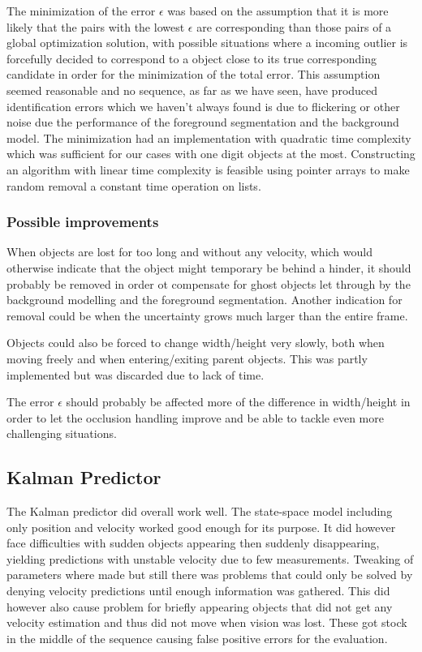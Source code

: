 The minimization of the error $\epsilon$ was based on the assumption that it is more likely that the pairs with the lowest $\epsilon$ are corresponding than those pairs of a global optimization solution, with possible situations where a incoming outlier is forcefully decided to correspond to a object close to its true corresponding candidate in order for the minimization of the total error. This assumption seemed reasonable and no sequence, as far as we have seen, have produced identification errors which we haven't always found is due to flickering or other noise due the performance of the foreground segmentation and the background model.
The minimization had an implementation with quadratic time complexity which was sufficient for our cases with one digit objects at the most. Constructing an algorithm with linear time complexity is feasible using pointer arrays to make random removal a constant time operation on lists.

\subsubsection{Possible improvements}
When objects are lost for too long and without any velocity, which would otherwise indicate that the object might temporary be behind a hinder, it should probably be removed in order ot compensate for ghost objects let through by the background modelling and the foreground segmentation. Another indication for removal could be when the uncertainty grows much larger than the entire frame.

Objects could also be forced to change width/height very slowly, both when moving freely and when entering/exiting parent objects. This was partly implemented but was discarded due to lack of time.

The error $\epsilon$ should probably be affected more of the difference in width/height in order to let the occlusion handling improve and be able to tackle even more challenging situations.

\subsection{Kalman Predictor}
The Kalman predictor did overall work well. The state-space model including only position and velocity worked good enough for its purpose. It did however face difficulties with sudden objects appearing then suddenly disappearing, yielding predictions with unstable velocity due to few measurements. Tweaking of parameters
where made but still there was problems that could only be solved by denying velocity predictions until enough information was gathered. This did however also cause problem for briefly appearing objects that did not get any velocity estimation and thus did not move when vision was lost. These got stock in the middle of the sequence causing false positive errors for the evaluation.

